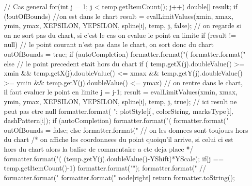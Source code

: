 \begin{code}
\begin{hide}
{{{         // Cas general
         for(int j = 1; j < temp.getItemCount(); j++) {
            double[] result;
            if (!outOfBounds) { //on est dans le chart
               result = evalLimitValues(xmin, xmax, ymin, ymax, XEPSILON, YEPSILON, spline[i], temp, j, false);
               // on regarde si on ne sort pas du chart, si c'est le cas on evalue le point en limite
               if (result != null) { // le point courant n'est pas dans le chart, on sort donc du chart
                  outOfBounds = true;
                  if (autoCompletion)
                     formatter.format("(%
                  formatter.format("}%
               }
            }
            else { // le point precedent etait hors du chart
               if (  temp.getX(j).doubleValue() >= xmin && temp.getX(j).doubleValue() <= xmax &&
                     temp.getY(j).doubleValue() >= ymin && temp.getY(j).doubleValue() <= ymax) {
                     // on rentre dans le chart, il faut evaluer le point en limite
                  j = j-1;
                  result = evalLimitValues(xmin, xmax, ymin, ymax, XEPSILON, YEPSILON, spline[i], temp, j, true);
                  // ici result ne peut pas etre null
                  formatter.format( ";%
                                    plotStyle[i], colorString, marksType[i], dashPattern[i]);
                  if (autoCompletion)
                     formatter.format("(%
                  formatter.format("%
                  outOfBounds = false;
               }
               else {
                  formatter.format("%
                  // on les donnees sont toujours hors du chart
               }
            }
            /* on affiche les coordonnees du point quoiqu'il arrive,
            si celui ci est hors du chart alors la balise de commentaire a ete deja place */
            formatter.format("(%
                                              (temp.getY(j).doubleValue()-YShift)*YScale);
            if(j == temp.getItemCount()-1)
               formatter.format("}");
            formatter.format(" %
//            formatter.format(" %
         }
         formatter.format(" node[right] {%
      }
      return formatter.toString();
   }



\end{hide}
\end{code}
